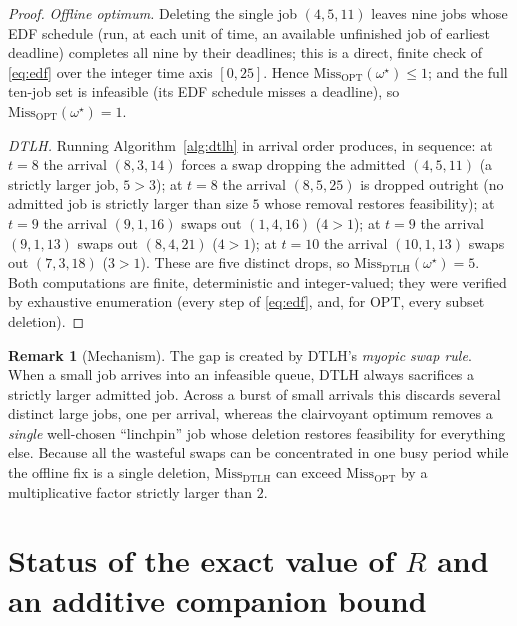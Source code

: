 \documentclass{amsart}
\theoremstyle{definition}
\newtheorem{remark}[theorem]{Remark}
\begin{document}
\begin{proof}
\emph{Offline optimum.} Deleting the single job $(4,5,11)$ leaves nine jobs whose
EDF schedule (run, at each unit of time, an available unfinished job of earliest
deadline) completes all nine by their deadlines; this is a direct, finite check
of \eqref{eq:edf} over the integer time axis $[0,25]$. Hence
$\mathrm{Miss}_{\mathrm{OPT}}(\omega^\star)\le1$; and the full ten-job set is
infeasible (its EDF schedule misses a deadline), so
$\mathrm{Miss}_{\mathrm{OPT}}(\omega^\star)=1$.

\emph{DTLH.} Running Algorithm~\ref{alg:dtlh} in arrival order produces, in
sequence: at $t=8$ the arrival $(8,3,14)$ forces a swap dropping the admitted
$(4,5,11)$ (a strictly larger job, $5>3$); at $t=8$ the arrival $(8,5,25)$ is
dropped outright (no admitted job is strictly larger than size $5$ whose removal
restores feasibility); at $t=9$ the arrival $(9,1,16)$ swaps out $(1,4,16)$
($4>1$); at $t=9$ the arrival $(9,1,13)$ swaps out $(8,4,21)$ ($4>1$); at $t=10$
the arrival $(10,1,13)$ swaps out $(7,3,18)$ ($3>1$). These are five distinct
drops, so $\mathrm{Miss}_{\mathrm{DTLH}}(\omega^\star)=5$. Both computations are
finite, deterministic and integer-valued; they were verified by exhaustive
enumeration (every step of \eqref{eq:edf}, and, for OPT, every subset deletion).
\end{proof}

\begin{remark}[Mechanism]
The gap is created by DTLH's \emph{myopic swap rule}. When a small job arrives
into an infeasible queue, DTLH always sacrifices a strictly larger admitted job.
Across a burst of small arrivals this discards several distinct large jobs, one
per arrival, whereas the clairvoyant optimum removes a \emph{single} well-chosen
``linchpin'' job whose deletion restores feasibility for everything else.
Because all the wasteful swaps can be concentrated in one busy period while the
offline fix is a single deletion, $\mathrm{Miss}_{\mathrm{DTLH}}$ can exceed
$\mathrm{Miss}_{\mathrm{OPT}}$ by a multiplicative factor strictly larger than
$2$.
\end{remark}

\section{Status of the exact value of $R$ and an additive companion bound}
\end{document}
